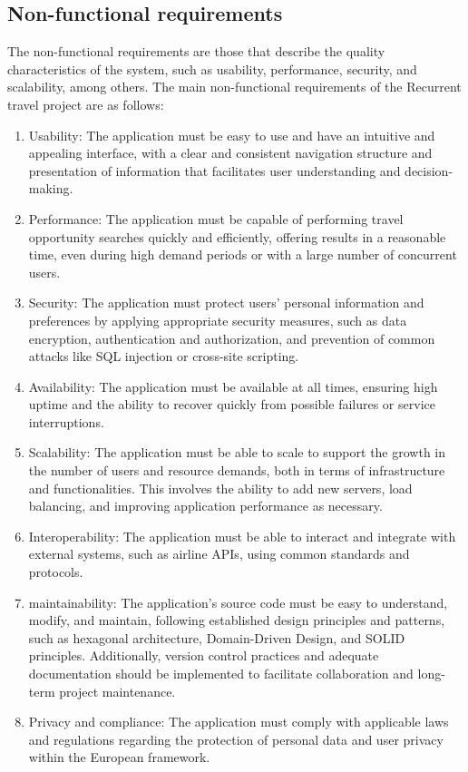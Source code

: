 \documentclass[../memory.tex]{subfiles}
\begin{document}
\subsection{Non-functional requirements}
The non-functional requirements are those that describe the quality
characteristics of the system, such as usability, performance, security, and
scalability, among others. The main non-functional requirements of the
Recurrent travel project are as follows:
\begin{enumerate}
	\item Usability: The application must be easy to use and have an intuitive
	      and appealing interface, with a clear and consistent navigation structure
	      and presentation of information that facilitates user understanding and
	      decision-making.
	\item Performance: The application must be capable of performing travel
	      opportunity searches quickly and efficiently, offering results in a
	      reasonable time, even during high demand periods or with a large number of
	      concurrent users.
	\item Security: The application must protect users' personal information
	      and preferences by applying appropriate security measures, such as data
	      encryption, authentication and authorization, and prevention of common
	      attacks like SQL injection or cross-site scripting.
	\item Availability: The application must be available at all times,
	      ensuring high uptime and the ability to recover quickly from possible
	      failures or service interruptions.
	\item Scalability: The application must be able to scale to support the
	      growth in the number of users and resource demands, both in terms of
	      infrastructure and functionalities. This involves the ability to add new
	      servers, load balancing, and improving application performance as
	      necessary.
	\item Interoperability: The application must be able to interact and
	      integrate with external systems, such as airline APIs, using common
	      standards and protocols.
	\item maintainability: The application's source code must be easy to
	      understand, modify, and maintain, following established design principles
	      and patterns, such as hexagonal architecture, Domain-Driven Design, and
	      SOLID principles. Additionally, version control practices and adequate
	      documentation should be implemented to facilitate collaboration and
	      long-term project maintenance.
	\item Privacy and compliance: The application must comply with applicable
	      laws and regulations regarding the protection of personal data and user
	      privacy within the European framework.
\end{enumerate}
\end{document}
